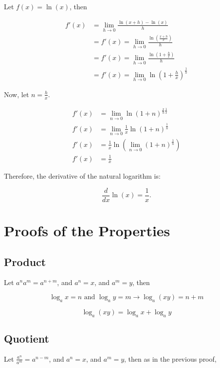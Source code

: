 Let \(f(x) = \ln(x)\), then

\begin{align*}
    f'(x) &= \lim_{h \to 0} \frac{\ln(x + h) - \ln(x)}{h}\\
    &= f'(x) = \lim_{h \to 0} \frac{\ln\left(\frac{x + h}{x}\right)}{h}\\
    &= f'(x) = \lim_{h \to 0} \frac{\ln\left(1 + \frac{h}{x}\right)}{h}\\
    &= f'(x) = \lim_{h \to 0} \ln{\left(1 + \frac{h}{x}\right)}^{\frac{1}{h}}
\end{align*}
 
Now, let \(n = \frac{h}{x}\).

\begin{align*}
    f'(x) &= \lim_{n \to 0} \ln{\left(1 + n\right)}^{\frac{x}{h} \frac{1}{x}}\\
    f'(x) &= \lim_{n \to 0} \frac{1}{x} \ln{\left(1 + n\right)}^{\frac{1}{n}}\\
    f'(x) &= \frac{1}{x} \ln \left(\lim_{n \to 0} {(1 + n)}^{\frac{1}{n}}\right)\\
    f'(x) &= \frac{1}{x}
\end{align*}

Therefore, the derivative of the natural logarithm is:

\[
    \frac{d}{dx} \ln(x) = \frac{1}{x}.
\]

\QED

\section{Proofs of the Properties}

\subsection{Product}

Let \(a^n a^m = a^{n + m}\), and \(a^n = x\), and \(a^m = y\), then

\[
    \log_a x = n \text{ and } \log_a y = m \rightarrow \log_a (xy) = n + m
\]

\[
    \log_a (xy) = \log_a x + \log_a y
\]

\QED

\subsection{Quotient}

Let \(\frac{a^n}{a^m} = a^{n - m}\), and \(a^n = x\), and \(a^m = y\), then as in the previous proof,

